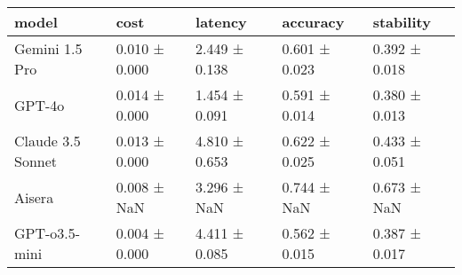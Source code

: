 \begin{tabular}{lllll}
\toprule
model & cost & latency & accuracy & stability \\
\midrule
Gemini 1.5 Pro & 0.010 ± 0.000 & 2.449 ± 0.138 & 0.601 ± 0.023 & 0.392 ± 0.018 \\
GPT-4o & 0.014 ± 0.000 & 1.454 ± 0.091 & 0.591 ± 0.014 & 0.380 ± 0.013 \\
Claude 3.5 Sonnet & 0.013 ± 0.000 & 4.810 ± 0.653 & 0.622 ± 0.025 & 0.433 ± 0.051 \\
Aisera & 0.008 ± NaN & 3.296 ± NaN & 0.744 ± NaN & 0.673 ± NaN \\
GPT-o3.5-mini & 0.004 ± 0.000 & 4.411 ± 0.085 & 0.562 ± 0.015 & 0.387 ± 0.017 \\
\bottomrule
\end{tabular}
